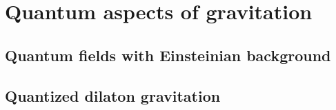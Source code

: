 \chapter{Quantum aspects of gravitation}

\section{Quantum fields with Einsteinian background}

\section{Quantized dilaton gravitation}